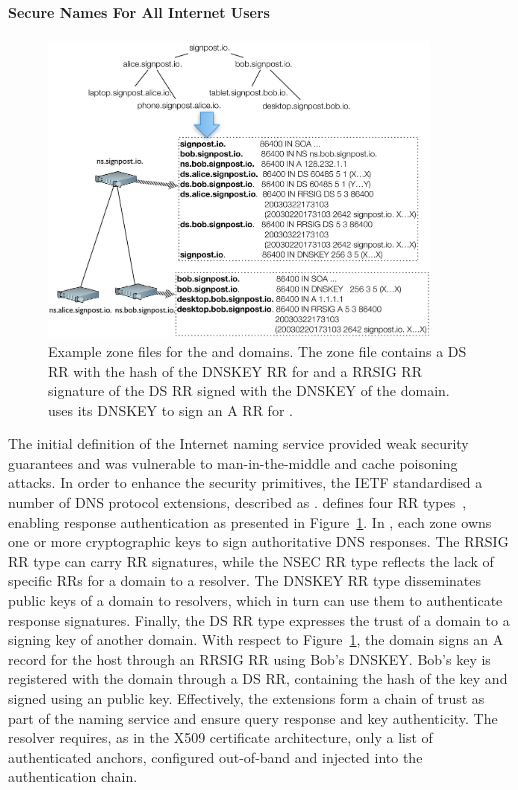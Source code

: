 \paragraph{Secure Names For All Internet Users}

\begin{figure}
  \centering
    \includegraphics[width=0.9\textwidth]{Chapter3/Chapter3Figs/DNSSEC_hierarchy}
    \caption[Example \dnssec zone files.]{Example \dnssec zone files for the
         and  domains. The  zone file
        contains a DS RR with the hash of the DNSKEY RR for   and a
        RRSIG RR signature of the DS RR signed with the DNSKEY of the
         domain.  uses its DNSKEY to sign an A RR for
        .}
  \label{fig:dnssec_hierarchy}
\end{figure}

The initial definition of the Internet naming service provided weak security
guarantees and was vulnerable to man-in-the-middle and cache
poisoning~ attacks.  In order to enhance the security
primitives, the IETF standardised a number of DNS protocol extensions, described
as \dnssec.  \dnssec defines four RR types~, enabling response
authentication as presented in Figure~\ref{fig:dnssec_hierarchy}.  In \dnssec,
each zone owns one or more cryptographic keys to sign authoritative DNS
responses. The RRSIG RR type can carry RR signatures,
while the NSEC RR type reflects the lack of specific RRs for a domain to a
resolver.  The DNSKEY RR type disseminates public keys of a domain to resolvers,
which in turn can use them to authenticate response signatures. Finally, the DS
RR type expresses the trust of a domain to a signing key of another domain. With
respect to Figure~\ref{fig:dnssec_hierarchy}, the domain  signs an A
record for the host  through an RRSIG RR using Bob's DNSKEY\@.
Bob's key is registered with the  domain through a DS RR, containing the
hash of the key and signed using an  public key.  Effectively, the \dnssec
extensions form a chain of trust as part of the naming service and ensure
query response and key authenticity. The resolver requires, as in the X509
certificate architecture, only a list of authenticated anchors, configured
out-of-band and injected into the authentication chain.

